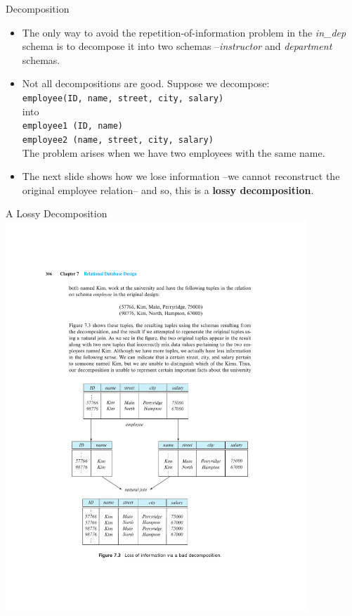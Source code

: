 \documentclass{beamer}
\begin{document}
\begin{frame}{Decomposition}
    \begin{itemize}
        \item The only way to avoid the repetition-of-information problem in the \textit{in\_dep} schema is to decompose it into two schemas --\textit{instructor} and \textit{department} schemas.
        \item Not all decompositions are good. Suppose we decompose: \\
            \quad \texttt{employee(ID, name, street, city, salary)} \\
            into \\
            \quad \texttt{employee1 (ID, name)} \\
            \quad \texttt{employee2 (name, street, city, salary)} \\
            The problem arises when we have two employees with the same name.
        \item The next slide shows how we lose information --we cannot reconstruct the original employee relation-- and so, this is a \textbf{lossy decomposition}.
    \end{itemize}
\end{frame}

\begin{frame}{A Lossy Decomposition}
    \centering
    \includegraphics[width=0.85\textwidth, trim={3cm 2cm 4cm 11.25cm}, clip]{figures/p306_loss}
\end{frame}
\end{document}
